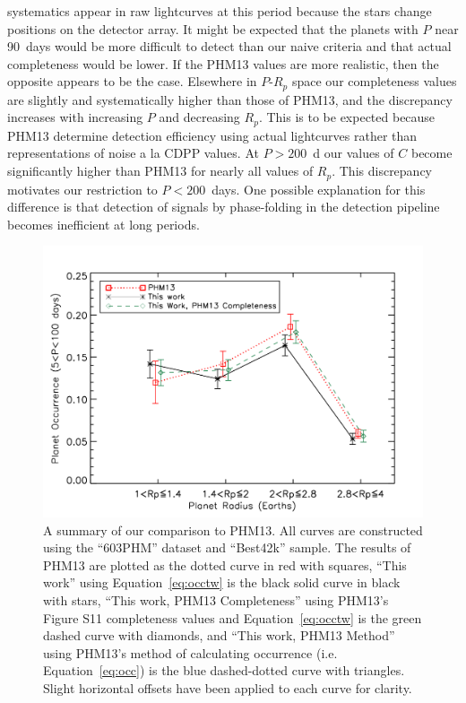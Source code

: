 systematics appear in raw \kep{} lightcurves at this period because
the stars change positions on the detector array.  It might be
expected that the planets with $P$ near 90~days would be more
difficult to detect than our naive criteria and that actual
completeness would be lower.  If the PHM13 values are more realistic,
then the opposite appears to be the case.  Elsewhere in $P$-$R_p$
space our completeness values are slightly and systematically higher
than those of PHM13, and the discrepancy increases with increasing $P$
and decreasing $R_p$.  This is to be expected because PHM13 determine
detection efficiency using actual lightcurves rather than
representations of noise a la CDPP values.  At $P>200$~d our values of
$C$ become significantly higher than PHM13 for nearly all values of
$R_p$.  This discrepancy motivates our restriction to $P < 200$~days.
One possible explanation for this difference is that detection of
signals by phase-folding in the \kep{} detection pipeline becomes
inefficient at long periods.

\begin{figure}
\centerline{\includegraphics[scale=0.55]{chap2/PHM13_mastercomp.pdf}}
\caption{A summary of our comparison to PHM13. All curves are
  constructed using the ``603PHM'' dataset and ``Best42k'' sample. The results
  of PHM13 are plotted as the dotted curve in red with
  squares, ``This work'' using Equation~\ref{eq:occtw} is the black
  solid curve in black with stars, ``This work, PHM13 Completeness'' using PHM13's Figure
  S11 completeness values and Equation~\ref{eq:occtw} is the green
  dashed curve with diamonds, and ``This work, PHM13 Method'' using PHM13's method of
  calculating occurrence (i.e. Equation~\ref{eq:occ}) is the blue
  dashed-dotted curve with triangles. Slight horizontal offsets have
  been applied to each curve for clarity.}
\label{fig:mastercomp} 
\end{figure}


